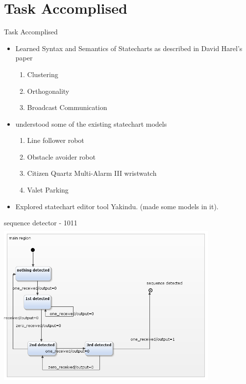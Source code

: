 \documentclass[10pt, a4paper]{beamer}
\begin{document}
\section{Task Accomplised}
\begin{frame}{Task Accomplised}
	\begin{itemize}
		\item Learned Syntax and Semantics of Statecharts as
		described in David Harel's paper
		\begin{enumerate}
			\item Clustering
			\item Orthogonality
			\item Broadcast Communication
		\end{enumerate}
		\item understood some of the existing statechart models
		\begin{enumerate}
			\item Line follower robot
			\item Obstacle avoider robot
			\item Citizen
			Quartz Multi-Alarm III wristwatch
			\item Valet Parking
		\end{enumerate}
	\item Explored statechart editor tool Yakindu. (made some models in it).
	\end{itemize}

\end{frame}
\begin{frame}{sequence detector - 1011}
\includegraphics[width=11cm, height=8.38cm]{sequence1011.png}
\end{frame}
\end{document}
